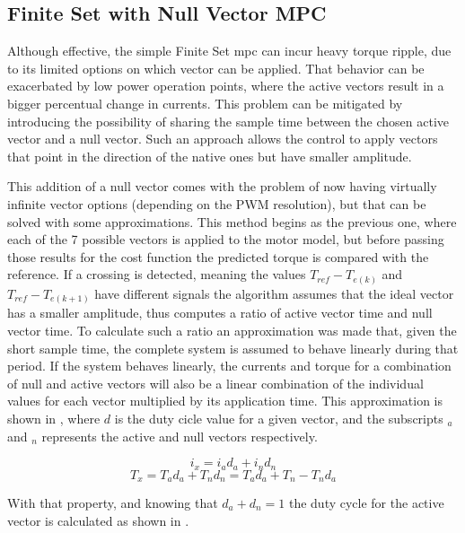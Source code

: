 \subsection{Finite Set with Null Vector MPC}

Although effective, the simple Finite Set \gls{mpc} can incur heavy torque ripple, due to its limited options on which vector can be applied. That behavior can be exacerbated by low power operation points, where the active vectors result in a bigger percentual change in currents. This problem can be mitigated by introducing the possibility of sharing the sample time between the chosen active vector and a null vector. Such an approach allows the control to apply vectors that point in the direction of the native ones but have smaller amplitude.

This addition of a null vector comes with the problem of now having virtually infinite vector options (depending on the PWM resolution), but that can be solved with some approximations. This method begins as the previous one, where each of the 7 possible vectors is applied to the motor model, but before passing those results for the cost function the predicted torque is compared with the reference. If a crossing is detected, meaning the values $T_{ref} - T_{e(k)}$ and $T_{ref} - T_{e(k+1)}$ have different signals the algorithm assumes that the ideal vector has a smaller amplitude, thus computes a ratio of active vector time and null vector time. To calculate such a ratio an approximation was made that, given the short sample time, the complete system is assumed to behave linearly during that period. If the system behaves linearly, the currents and torque for a combination of null and active vectors will also be a linear combination of the individual values for each vector multiplied by its application time. This approximation is shown in , where $d$ is the duty cicle value for a given vector, and the subscripts $_a$ and $_n$ represents the active and null vectors respectively.

\begin{equation}
	i_x = i_a d_a + i_n d_n
	\label{eq:linear_combination}
\end{equation}
\begin{equation}
	T_x = T_a d_a + T_n d_n = T_a d_a + T_n - T_n d_a
	\label{eq:linear_combination_torque}
\end{equation}

With that property, and knowing that $d_a + d_n = 1$ the duty cycle for the active vector is calculated as shown in .

